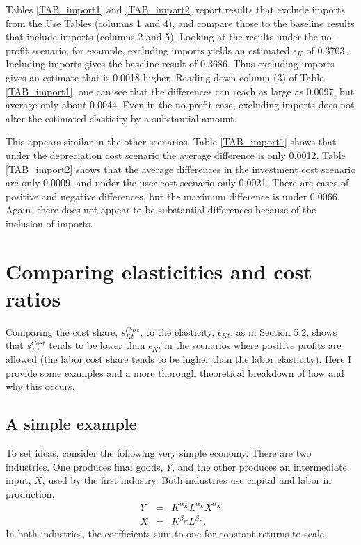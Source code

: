 \documentclass[11pt]{article}
\begin{document}
Tables \ref{TAB_import1} and \ref{TAB_import2} report results that exclude imports from the Use Tables (columns 1 and 4), and compare those to the baseline results that include imports (columns 2 and 5). Looking at the results under the no-profit scenario, for example, excluding imports yields an estimated $\epsilon_K$ of 0.3703. Including imports gives the baseline result of 0.3686. Thus excluding imports gives an estimate that is 0.0018 higher. Reading down column (3) of Table \ref{TAB_import1}, one can see that the differences can reach as large as 0.0097, but average only about 0.0044. Even in the no-profit case, excluding imports does not alter the estimated elasticity by a substantial amount.

This appears similar in the other scenarios. Table \ref{TAB_import1} shows that under the depreciation cost scenario the average difference is only 0.0012. Table \ref{TAB_import2} shows that the average differences in the investment cost scenario are only 0.0009, and under the user cost scenario only 0.0021. There are cases of positive and negative differences, but the maximum difference is under 0.0066. Again, there does not appear to be substantial differences because of the inclusion of imports.

\section{Comparing elasticities and cost ratios}
Comparing the cost share, $s_{Kt}^{Cost}$, to the elasticity, $\epsilon_{Kt}$, as in Section 5.2, shows that $s_{Kt}^{Cost}$ tends to be lower than $\epsilon_{Kt}$ in the scenarios where positive profits are allowed (the labor cost share tends to be higher than the labor elasticity). Here I provide some examples and a more thorough theoretical breakdown of how and why this occurs. 

\subsection{A simple example}
To set ideas, consider the following very simple economy. There are two industries. One produces final goods, $Y$, and the other produces an intermediate input, $X$, used by the first industry. Both industries use capital and labor in production. 
\begin{eqnarray}
	Y &=& K^{\alpha_K} L^{\alpha_L} X^{\alpha_X} \\
	X &=& K^{\beta_K} L^{\beta_L}.
\end{eqnarray}
In both industries, the coefficients sum to one for constant returns to scale. 
\end{document}
